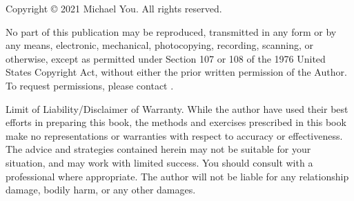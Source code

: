 \documentclass[10pt, twoside, ebook]{memoir}
\begin{document}
\begin{titlingpage}
  
\end{titlingpage}

\maketitle

\clearpage
\thispagestyle{empty}
\null\vfill
\begin{flushleft}
  Copyright © 2021 Michael You. All rights reserved.
  \bigskip

  No part of this publication may be reproduced, transmitted in any form or by any
  means, electronic, mechanical, photocopying, recording, scanning, or otherwise,
  except as permitted under Section 107 or 108 of the 1976 United States Copyright
  Act, without either the prior written permission of the Author. To request
  permissions, please contact
  \href{mailto:viridity.capital@gmail.com}{}.
  \bigskip

  Limit of Liability/Disclaimer of Warranty. While the author have used their best
  efforts in preparing this book, the methods and exercises prescribed in this
  book make no representations or warranties with respect to accuracy or
  effectiveness. The advice and strategies contained herein may not be suitable
  for your situation, and may work with limited success. You should consult with a
  professional where appropriate. The author will not be liable for any
  relationship damage, bodily harm, or any other damages.
  \bigskip
\end{flushleft}

\frontmatter
\tableofcontents*



\mainmatter


\backmatter



\printglossaries

\printindex

\cleartoverso

\end{document}
